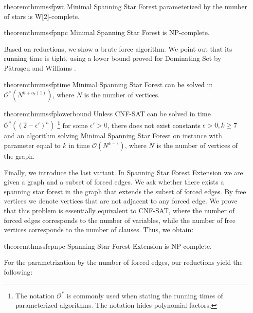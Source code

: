 \documentclass[en]{pracamgr}
\theoremstyle{definition}
\newcommand{\mssfp}{{\sc Minimal Spanning Star Forest}}
\newcommand{\ssfep}{{\sc Spanning Star Forest Extension}}
\newcommand{\domsetp}{{\sc Dominating Set}}
\newcommand{\cnfsat}{{\sc CNF-SAT}}
\begin{document}
\begin{restatable}{theorem}{thmmssfpwc}\label{thm-mssfp-w2c}
	\mssfp{} parameterized by the number of stars is \textup{W[2]}-complete.
\end{restatable}

\begin{restatable}{theorem}{thmmssfpnpc}\label{thm-mssfp-npc}
	\mssfp{} is \textup{NP-complete}.
\end{restatable}

\noindent
Based on reductions, we show a brute force algorithm. We point out that its running time is tight, using a lower bound proved for \domsetp{} by Pătraşcu and Williams \cite{DomSet}. 

\begin{restatable}{theorem}{thmmssfptime}\label{thm-mssfp-time}
	\mssfp{} can be solved in $\mathcal{O}^*(N^{k + o_k(1)})$, where $N$ is the number of vertices.
\end{restatable}

\begin{restatable}{theorem}{thmmssfplowerbound}\label{thm-mssfp-lowerbound}
	Unless \cnfsat{} can be solved in time $\mathcal{O}^*((2-\epsilon')^n)$
	\footnote{The notation $\mathcal{O}^*$ is commonly used when stating the running times of parameterized algorithms. The notation hides polynomial factors.}
	 for some $\epsilon' > 0$, there does not exist constants $\epsilon > 0,k\geq 7$ and an algorithm solving \mssfp{} on instance with parameter equal to $k$ in time $\mathcal{O}(N^{k-\epsilon})$, where $N$ is the number of vertices of the graph.
\end{restatable}

Finally, we introduce the last variant. In \ssfep{} we are given a graph and a subset of forced edges. We ask whether there exists a spanning star forest in the graph that extends the subset of forced edges. By free vertices we denote vertices that are not adjacent to any forced edge. We prove that this problem is essentially equivalent to \cnfsat{}, where the number of forced edges corresponds to the number of variables, while the number of free vertices corresponds to the number of clauses. Thus, we obtain:

\begin{restatable}{theorem}{thmssfepnpc}\label{thm-ssfep-npc}
	\ssfep{} is \textup{NP}-complete.
\end{restatable}

\noindent
For the parametrization by the number of forced edges, our reductions yield the following:
\end{document}

